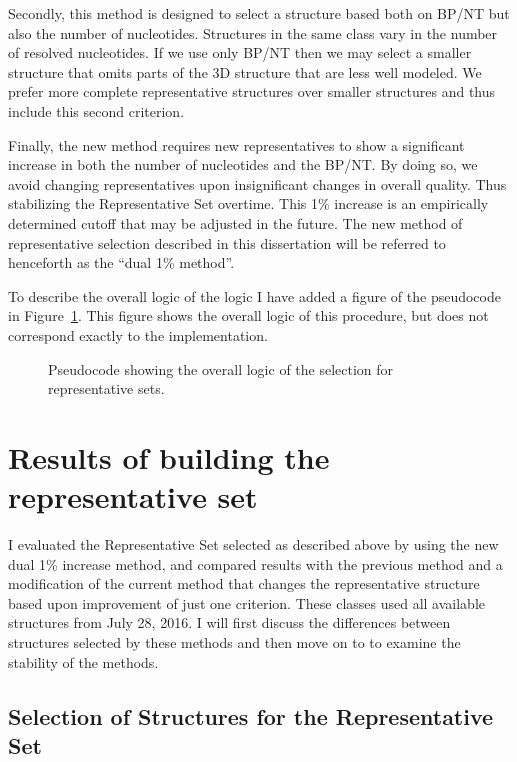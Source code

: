 Secondly, this method is designed to select a structure based both on BP/NT but
also the number of nucleotides. Structures in the same class vary in the number
of resolved nucleotides. If we use only BP/NT then we may select a  smaller
structure that omits parts of the 3D structure that are less well modeled. We
prefer more complete representative structures over smaller structures and thus
include this second criterion.

Finally, the new method requires new representatives to show a significant
increase in both the number of nucleotides and the BP/NT. By doing so, we avoid
changing representatives upon insignificant changes in overall quality. Thus
stabilizing the Representative Set overtime. This 1\% increase is an empirically
determined cutoff that may be adjusted in the future. The new method of
representative selection described in this dissertation will be referred to
henceforth as the ``dual 1\% method''.

To describe the overall logic of the logic I have added a figure of the
pseudocode in Figure~\ref{fig:pseudocode-representatives}. This figure shows the
overall logic of this procedure, but does not correspond exactly to the
implementation.

\begin{figure}
  \caption{Pseudocode showing the overall logic of the selection for
  representative sets.}
  \label{fig:pseudocode-representatives}
\end{figure}

\section{Results of building the representative set}

I evaluated the Representative Set selected as described above by using the new
dual 1\% increase method, and compared results with the previous method and a
modification of the current method that changes the representative structure
based upon improvement of just one criterion. These classes used all available
structures from July 28, 2016. I will first discuss the differences between
structures selected by these methods and then move on to to examine the
stability of the methods.

\subsection{Selection of Structures for the Representative Set}

